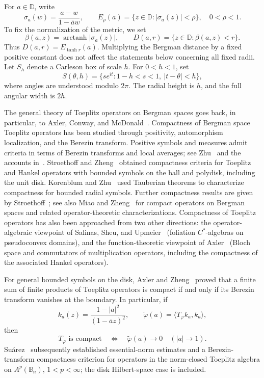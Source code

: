 \documentclass[12pt,a4paper]{article}
\theoremstyle{remark}
\newcommand{\D}{\mathbb D}
\begin{document}
For $a\in\D$, write
\[
\sigma_a(w)=\frac{a-w}{1-\overline a w},
\qquad
E_\rho(a)=\{z\in\D:|\sigma_a(z)|<\rho\},\quad 0<\rho<1.
\]
To fix the normalization of the metric, we set
\[
\beta(a,z)=\operatorname{arctanh}|\sigma_a(z)|,
\qquad D(a,r)=\{z\in\D:\beta(a,z)<r\}.
\]
Thus $D(a,r)=E_{\tanh r}(a)$. Multiplying the Bergman distance by a fixed positive constant does not affect the statements below concerning all fixed radii. Let $S_h$ denote a Carleson box of scale $h$. For $0<h<1$, set
\[
S(\theta,h)=\{se^{it}:1-h<s<1,\ |t-\theta|<h\},
\]
where angles are understood modulo $2\pi$. The radial height is $h$, and the full angular width is $2h$.

The general theory of Toeplitz operators on Bergman spaces goes back, in particular, to Axler, Conway, and McDonald~\cite{ACM1982}. 
Compactness of Bergman space Toeplitz operators has been studied through positivity, automorphism localization, and the Berezin transform. Positive symbols and measures admit criteria in terms of Berezin transforms and local averages; see Zhu~\cite{Zhu1988} and the accounts in~\cite{HKZ2000,Zhu2007}. Stroethoff and Zheng~\cite{SZ1992} obtained compactness criteria for Toeplitz and Hankel operators with bounded symbols on the ball and polydisk, including the unit disk. Korenblum and Zhu~\cite{KZ1995} used Tauberian theorems to characterize compactness for bounded radial symbols. Further compactness results are given by Stroethoff~\cite{Stroethoff1998}; see also Miao and Zheng~\cite{MiaoZheng2004} for compact operators on Bergman spaces and related operator-theoretic characterizations. Compactness of Toeplitz  operators has also been approached from two other directions: the operator-algebraic viewpoint of Salinas, Sheu, and Upmeier~\cite{SSU1989} (foliation $C^*$-algebras on pseudoconvex domains), and the function-theoretic viewpoint of Axler~\cite{Axler1986} (Bloch space and commutators of multiplication operators, including the compactness of the associated Hankel operators).


For general bounded symbols on the disk, Axler and Zheng~\cite{AZ1998} proved that a finite sum of finite products of Toeplitz operators is compact if and only if its Berezin transform vanishes at the boundary. In particular, if
\[
k_a(z)=\frac{1-|a|^2}{(1-\overline a z)^2},
\qquad
\widetilde\varphi(a)=\langle T_\varphi k_a,k_a\rangle,
\]
then
\[
T_\varphi\text{ is compact}
\quad\Longleftrightarrow\quad
\widetilde\varphi(a)\longrightarrow0\quad(|a|\to1).
\]
Su\'arez~\cite{Suarez2007} subsequently established essential-norm estimates and a Berezin-transform compactness criterion for operators in the norm-closed Toeplitz algebra on $A^p(\mathbb B_n)$, $1<p<\infty$; the disk Hilbert-space case is included.
\end{document}
